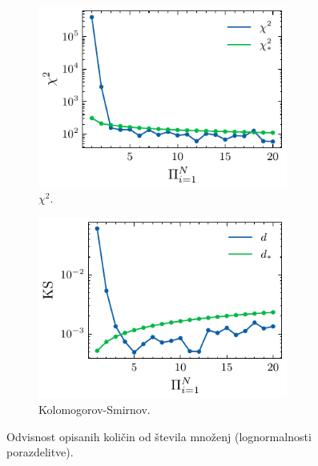 \documentclass[11pt, oneside]{article}
\theoremstyle{definition}
\begin{document}
\begin{figure}[h!]
\begin{subfigure}[b]{0.49\textwidth}
        \includegraphics[width=0.9\textwidth]{reddit_times_chi2.pdf}
        \caption{$\chi^2$.}
        \label{fig: rtimes3}
    \end{subfigure}
    \hfill
    \begin{subfigure}[b]{0.49\textwidth}
        \centering
        \includegraphics[width=0.9\textwidth]{reddit_times_ks.pdf}
        \caption{Kolomogorov-Smirnov.}
        \label{fig: rtimes4}
    \end{subfigure}
    \caption{Odvisnost opisanih količin od števila množenj (lognormalnosti porazdelitve).}
    \label{fig: rtimes}
\end{figure}
\end{document}
